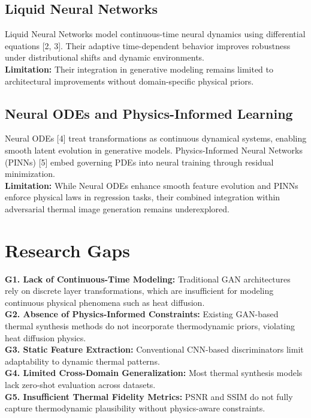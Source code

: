 \documentclass[12pt,a4paper]{report}
\begin{document}
\subsection{Liquid Neural Networks}
Liquid Neural Networks model continuous-time neural dynamics using differential equations [2, 3]. Their adaptive time-dependent behavior improves robustness under distributional shifts and dynamic environments. \\
\textbf{Limitation:} Their integration in generative modeling remains limited to architectural improvements without domain-specific physical priors.

\subsection{Neural ODEs and Physics-Informed Learning}
Neural ODEs [4] treat transformations as continuous dynamical systems, enabling smooth latent evolution in generative models. Physics-Informed Neural Networks (PINNs) [5] embed governing PDEs into neural training through residual minimization. \\
\textbf{Limitation:} While Neural ODEs enhance smooth feature evolution and PINNs enforce physical laws in regression tasks, their combined integration within adversarial thermal image generation remains underexplored.

\section{Research Gaps}
\textbf{G1. Lack of Continuous-Time Modeling:} Traditional GAN architectures rely on discrete layer transformations, which are insufficient for modeling continuous physical phenomena such as heat diffusion. \\
\textbf{G2. Absence of Physics-Informed Constraints:} Existing GAN-based thermal synthesis methods do not incorporate thermodynamic priors, violating heat diffusion physics. \\
\textbf{G3. Static Feature Extraction:} Conventional CNN-based discriminators limit adaptability to dynamic thermal patterns. \\
\textbf{G4. Limited Cross-Domain Generalization:} Most thermal synthesis models lack zero-shot evaluation across datasets. \\
\textbf{G5. Insufficient Thermal Fidelity Metrics:} PSNR and SSIM do not fully capture thermodynamic plausibility without physics-aware constraints.
\end{document}

